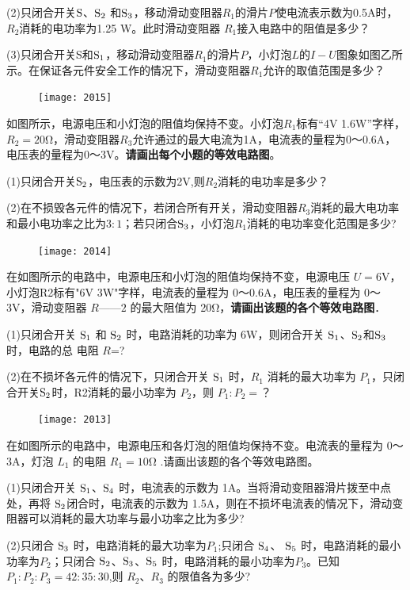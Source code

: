 \documentclass[11pt,a4paper]{article}
\newcommand{\nianfen}[1]{\hspace{-2em}{(#1\textbf{·}\textit{青岛})}}
\begin{document}
	(2)只闭合开关$\rm S $、$\rm S_2 $ 和$\rm S_3 $，移动滑动变阻器$ R_1 $的滑片$ P $使电流表示数为0.5A时，$ R_2 $消耗的电功率为1.25 W。此时滑动变阻器 $ R_1 $接入电路中的阻值是多少？
	
	(3)只闭合开关S和$\rm S_1 $，移动滑动变阻器$ R_1 $的滑片$ P $，小灯泡$ L $的$ I-U $图象如图乙所示。在保证各元件安全工作的情况下，滑动变阻器$ R_1 $允许的取值范围是多少？
	\clearpage
	
	\begin{figure}
		\texttt{[image: 2015]}
	\end{figure}

	\nianfen{2015}如图所示，电源电压和小灯泡的阻值均保持不变。小灯泡$ R_1 $标有“4V 1.6W”字样，$ R_2=20$Ω，滑动变阻器$ R_3 $允许通过的最大电流为1A，电流表的量程为0～0.6A，电压表的量程为0～3V。\textbf{请画出每个小题的等效电路图}。

	(1)只闭合开关$\rm S_2 $，电压表的示数为2V,则$R_2$消耗的电功率是多少？
	
	(2)在不损毁各元件的情况下，若闭合所有开关，滑动变阻器$R_3$消耗的最大电功率和最小电功率之比为$3:1$；若只闭合$\rm S_3$，小灯泡$R_1$消耗的电功率变化范围是多少?
	\clearpage
	
	\begin{figure}
	\texttt{[image: 2014]}
	\end{figure}

	\nianfen{2014}在如图所示的电路中，电源电压和小灯泡的阻值均保持不变，电源电压 $ U=6 $V，小灯泡R2标有"6V  3W"字样，电流表的量程为 0～0.6A，电压表的量程为 0～3V，滑动变阻器 $ R——2 $ 的最大阻值为 20Ω，\textbf{请画出该题的各个等效电路图}．
	
	(1)只闭合开关 $\rm S_1 $ 和 $\rm S_2 $ 时，电路消耗的功率为 6W，则闭合开关 $\rm S_1 $、$\rm S_2 $和$\rm S_3 $时，电路的总
	电阻 $ R $=?
	
	(2)在不损坏各元件的情况下，只闭合开关 $\rm S_1 $ 时，$ R_1 $ 消耗的最大功率为 $ P_1 $，只闭合开关$\rm S_2 $时，R2消耗的最小功率为 $ P_2 $，则 $ P_1:P_2= $？
	\clearpage
	
	\begin{figure}
		\texttt{[image: 2013]}
	\end{figure}
	
	\nianfen{2013}在如图所示的电路中，电源电压和各灯泡的阻值均保持不变。电流表的量程为 0～3A，灯泡 $ L_1 $ 的电阻 $ R_1=10 $Ω .请画出该题的各个等效电路图。
	
	(1)只闭合开关 $\rm S_1 $、$\rm S_4 $ 时，电流表的示数为 1A。当将滑动变阻器滑片拨至中点处，再将 $\rm S_2 $闭合时，电流表的示数为 1.5A，则在不损坏电流表的情况下，滑动变阻器可以消耗的最大功率与最小功率之比为多少?
	
	(2)只闭合 $\rm S_3 $ 时，电路消耗的最大功率为$ P_1 $;只闭合 $\rm S_4$、 $\rm S_5 $ 时，电路消耗的最小功率为$ P_2 $；只闭合 $\rm S_2 $、$\rm S_3 $、$\rm S_5 $ 时，电路消耗的最小功率为$ P_3 $。已知 $ P_1:P_2:P_3=42:35:30 $,则 $ R_2 $、$ R_3 $ 的限值各为多少?
\end{document}
